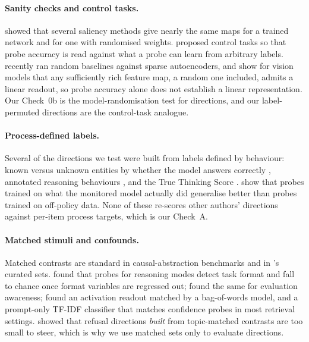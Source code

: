\documentclass[11pt]{article}
\begin{document}
\paragraph{Sanity checks and control tasks.} \citet{adebayo2018sanity} showed that several saliency methods give nearly the same maps for a trained network and for one with randomised weights. \citet{hewitt2019control} proposed control tasks so that probe accuracy is read against what a probe can learn from arbitrary labels. \citet{korznikov2026sae} recently ran random baselines against sparse autoencoders, and \citet{kutluozen2026linear} show for vision models that any sufficiently rich feature map, a random one included, admits a linear readout, so probe accuracy alone does not establish a linear representation. Our Check~0b is the model-randomisation test for directions, and our label-permuted directions are the control-task analogue.

\paragraph{Process-defined labels.} Several of the directions we test were built from labels defined by behaviour: known versus unknown entities by whether the model answers correctly \citep{ferrando2025entities}, annotated reasoning behaviours \citep{ward2025backtracking,venhoff2025steering}, and the True Thinking Score \citep{zhao2025truethinking}. \citet{kirch2026offpolicy} show that probes trained on what the monitored model actually did generalise better than probes trained on off-policy data. None of these re-scores other authors' directions against per-item process targets, which is our Check~A.

\paragraph{Matched stimuli and confounds.} Matched contrasts are standard in causal-abstraction benchmarks and in \citet{marks2024geometry}'s curated sets. \citet{sahoo2026format} found that probes for reasoning modes detect task format and fall to chance once format variables are regressed out; \citet{devbunova2026format} found the same for evaluation awareness; \citet{sadhu2026compliance} found an activation readout matched by a bag-of-words model, and \citet{ghosh2026confidence} a prompt-only TF-IDF classifier that matches confidence probes in most retrieval settings. \citet{petrov2026topic} showed that refusal directions \emph{built} from topic-matched contrasts are too small to steer, which is why we use matched sets only to evaluate directions.
\end{document}
